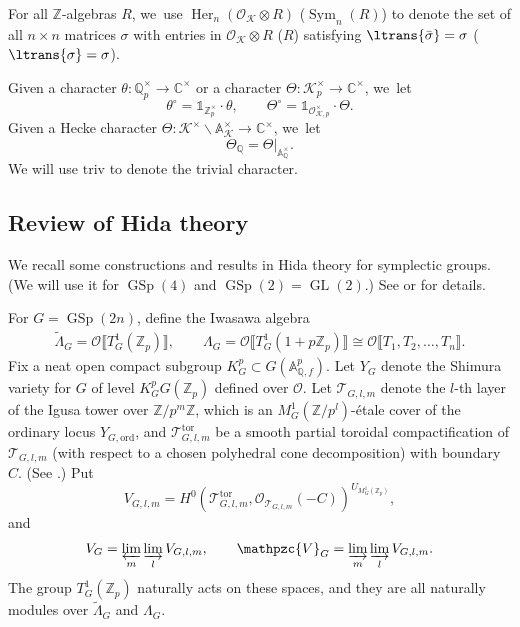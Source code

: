 \documentclass[JEP,XML,SOM,Unicode,published]{cedram}
\theoremstyle{plain}
\theoremstyle{remark}
\newcommand{\bA}{\mathbb{A}}
\newcommand{\bC}{\mathbb{C}}
\newcommand{\bQ}{\mathbb{Q}}
\newcommand{\bZ}{\mathbb{Z}}
\newcommand{\cK}{\mathcal{K}}
\newcommand{\cO}{\mathcal{O}}
\newcommand{\sT}{\mathscr{T}}
\newcommand{\pzV}{\mathpzc{V}}
\DeclareMathOperator{\GL}{GL}
\DeclareMathOperator{\GSp}{GSp}
\newcommand{\ord}{\mathrm{ord}}
\newcommand{\triv}{\mathrm{triv}}
\newcommand{\tor}{\mathrm{tor}}
\DeclareMathOperator{\Her}{Her}
\DeclareMathOperator{\Sym}{Sym}
\let\wt\widetilde
\let\llb\llbracket
\let\rrb\rrbracket
\begin{document}
For all $\bZ$-algebras $R$, we~use $\Her_n(\cO_\cK\otimes R)$ (\resp $\Sym_n(R)$) to denote the set of all $n\times n$ matrices $\sigma$ with entries in $\cO_\cK\otimes R$ (\resp $R$) satisfying $\ltrans{\bar{\sigma}}=\sigma$ (\resp $\ltrans{\sigma}=\sigma$).

Given a character $\theta:\bQ^\times_p\to \bC^\times$ or a character $\Theta:\cK^\times_p\to\bC^\times$, we~let
\begin{equation}
\label{eq:char-circ}
\theta^\circ=\mathds{1}_{\bZ^\times_p}\cdot \theta,
\qquad
\Theta^\circ=\mathds{1}_{\cO^\times_{\cK,p}}\cdot \Theta.
\end{equation}
Given a Hecke character $\Theta:\cK^\times\backslash\bA^\times_\cK\to\bC^\times$, we~let
\[
\Theta_\bQ=\Theta|_{\bA^\times_\bQ}.
\]
We will use $\triv$ to denote the trivial character.

\subsection{Review of Hida theory}\label{sec:Hida}
We recall some constructions and results in Hida theory for symplectic groups. (We will use it for $\GSp(4)$ and $\GSp(2)=\GL(2)$.) See \cite{HidaCon}or \cite[\S6.1]{SLF} for details.

For $G=\GSp(2n)$, define the Iwasawa algebra
\begin{align}
\label{eq:Iw-alg}
\wt{\Lambda}_G=\cO\llb T^1_G(\bZ_p)\rrb,
\qquad
\Lambda_G=\cO\llb T^1_G(1+p\bZ_p)\rrb\cong\cO\llb T_1,T_2,\dots,T_n\rrb.
\end{align}
Fix a neat open compact subgroup $K^p_G\subset G(\bA^p_{\bQ,f})$. Let $Y_G$ denote the Shimura variety for $G$ of level $K^p_G G(\bZ_p)$ defined over $\cO$. Let $\sT_{G,l,m}$ denote the $l$-th layer of the Igusa tower over $\bZ/p^m\bZ$, which is an $M^1_G(\bZ/p^l)$-\'{e}tale cover of the ordinary locus $Y_{G,\ord}$, and $\sT^\tor_{G,l,m}$ be a smooth partial toroidal compactification of $\sT_{G,l,m}$ (with respect to a chosen polyhedral cone decomposition) with boundary $C$. (See \cite[\S\S2.1,\,3.1,\,3.2]{HidaCon}.) Put
\[
V_{G,l,m}=H^0\left(\sT^\tor_{G,l,m},\cO_{\sT_{G,l,m}}(-C)\right)^{U_{M^1_G(\bZ_p)}},
\]
and
\begin{align*}
V_G=\varprojlim_m\varinjlim_l V_{G,l,m},
\qquad\pzV_G=\varinjlim_m\varinjlim_l V_{G,l,m}.
\end{align*}
The group $T^1_G(\bZ_p)$ naturally acts on these spaces, and they are all naturally modules over $\wt{\Lambda}_G$ and $\Lambda_G$.
\end{document}
